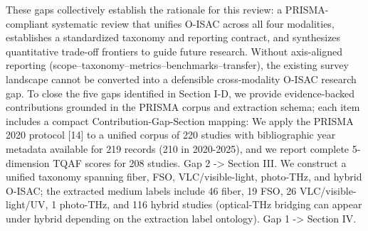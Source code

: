 {}These gaps collectively establish the rationale for this review: a PRISMA-compliant systematic review that unifies O-ISAC across all four modalities, establishes a standardized taxonomy and reporting contract, and synthesizes quantitative trade-off frontiers to guide future research.\markdownRendererInterblockSeparator
{}\markdownRendererBlockQuoteBegin
{} Without axis-aligned reporting (scope–taxonomy–metrics–benchmarks–transfer), the existing survey landscape cannot be converted into a defensible cross-modality O-ISAC research gap.\markdownRendererBlockQuoteEnd \markdownRendererInterblockSeparator
{}
\markdownRendererSectionEnd \markdownRendererSectionBegin
{}\markdownRendererInterblockSeparator
{}To close the five gaps identified in Section I-D, we provide evidence-backed contributions grounded in the PRISMA corpus and extraction schema; each item includes a compact Contribution-Gap-Section mapping:\markdownRendererInterblockSeparator
{}\markdownRendererOlBegin
{} We apply the PRISMA 2020 protocol [14] to a unified corpus of 220 studies with bibliographic year metadata available for 219 records (210 in 2020-2025), and we report complete 5-dimension TQAF scores for 208 studies.  Gap 2 -> Section III.\markdownRendererOlItemEnd 
{} We construct a unified taxonomy spanning fiber, FSO, VLC/visible-light, photo-THz, and hybrid O-ISAC; the extracted medium labels include 46 fiber, 19 FSO, 26 VLC/visible-light/UV, 1 photo-THz, and 116 hybrid studies (optical-THz bridging can appear under hybrid depending on the extraction label ontology).  Gap 1 -> Section IV.\markdownRendererOlItemEnd 
